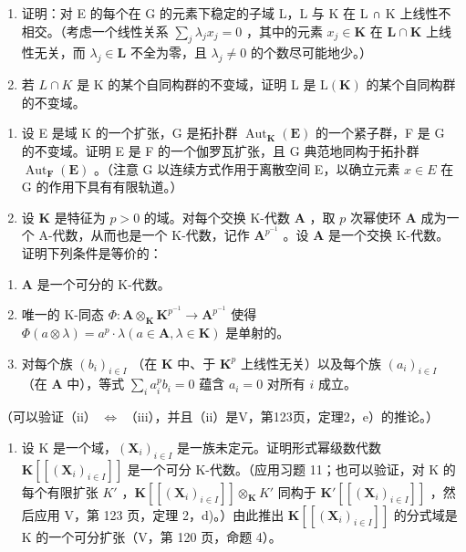 \begin{enumerate}
\def\labelenumi{\alph{enumi})}
\item
  证明：对 E 的每个在 G 的元素下稳定的子域 L，L 与 K 在 L ∩ K 上线性不相交。（考虑一个线性关系 \(\sum_{j}\lambda_{j}x_{j}=0\) ，其中的元素 \(x_{j} \in \mathbf{K}\) 在 \(\mathbf{L} \cap \mathbf{K}\) 上线性无关，而 \(\lambda_{j} \in \mathbf{L}\) 不全为零，且 \(\lambda_{j} \neq 0\) 的个数尽可能地少。）
\item
  若 \(L \cap K\) 是 K 的某个自同构群的不变域，证明 L 是 \(\mathrm{L}(\mathbf{K})\) 的某个自同构群的不变域。
\end{enumerate}

\begin{enumerate}
\def\labelenumi{\arabic{enumi})}
\setcounter{enumi}{9}
\item
  设 E 是域 K 的一个扩张，G 是拓扑群 \(\operatorname{Aut}_{\mathbf{K}}(\mathbf{E})\) 的一个紧子群，F 是 G 的不变域。证明 E 是 F 的一个伽罗瓦扩张，且 G 典范地同构于拓扑群 \(\operatorname{Aut}_{\mathbf{F}}(\mathbf{E})\) 。（注意 G 以连续方式作用于离散空间 E，以确立元素 \(x \in E\) 在 G 的作用下具有有限轨道。）
\item
  设 \(\mathbf{K}\) 是特征为 \(p > 0\) 的域。对每个交换 K-代数 \(\mathbf{A}\) ，取 \(p\) 次幂使环 \(\mathbf{A}\) 成为一个 A-代数，从而也是一个 K-代数，记作 \(\mathbf{A}^{p^{-1}}\) 。设 \(\mathbf{A}\) 是一个交换 K-代数。证明下列条件是等价的：
\end{enumerate}

\begin{enumerate}
\def\labelenumi{(\roman{enumi})}
\item
  \(\mathbf{A}\) 是一个可分的 K-代数。
\item
  唯一的 K-同态 \(\Phi: \mathbf{A} \otimes_{\mathbf{K}} \mathbf{K}^{p^{-1}} \to \mathbf{A}^{p^{-1}}\) 使得 \(\Phi(a \otimes \lambda) = a^p \cdot \lambda (a \in \mathbf{A}, \lambda \in \mathbf{K})\) 是单射的。
\item
  对每个族 \((b_{i})_{i\in I}\) （在 \(\mathbf{K}\) 中、于 \(\mathbf{K}^p\) 上线性无关）以及每个族 \((a_{i})_{i\in I}\) （在 \(\mathbf{A}\) 中），等式 \(\sum_{i}a_i^p b_i = 0\) 蕴含 \(a_{i} = 0\) 对所有 \(i\) 成立。
\end{enumerate}

（可以验证（ii） \(\Leftrightarrow\) （iii），并且（ii）是V，第123页，定理2，e）的推论。）

\begin{enumerate}
\def\labelenumi{\arabic{enumi})}
\setcounter{enumi}{11}
\tightlist
\item
  设 K 是一个域，\((\mathbf{X}_{i})_{i\in I}\) 是一族未定元。证明形式幂级数代数 \(\mathbf{K}[[(\mathbf{X}_{i})_{i\in I}]]\) 是一个可分 K-代数。（应用习题 11；也可以验证，对 K 的每个有限扩张 \(K'\) ，\(\mathbf{K}[[(\mathbf{X}_{i})_{i\in I}]]\otimes_{\mathbf{K}}K'\) 同构于 \(\mathbf{K}'[[(\mathbf{X}_{i})_{i\in I}]]\) ，然后应用 V，第 123 页，定理 2，d)。）由此推出 \(\mathbf{K}[[(\mathbf{X}_{i})_{i\in I}]]\) 的分式域是 K 的一个可分扩张（V，第 120 页，命题 4）。
\end{enumerate}

